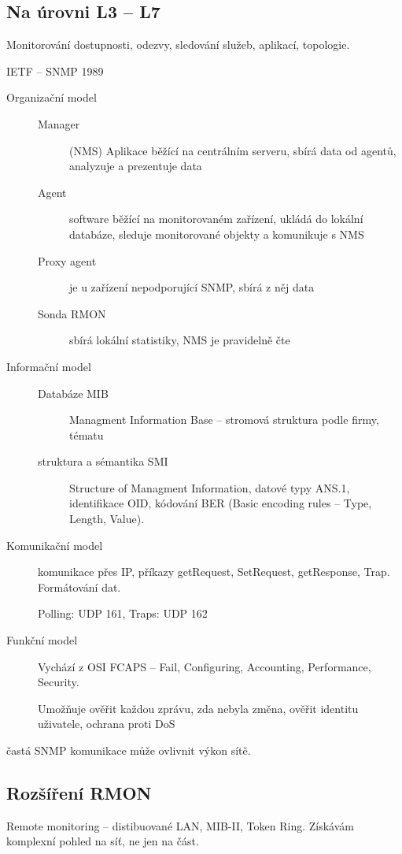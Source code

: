 \documentclass[a4paper, 11pt]{report}
\begin{document}
\subsection{Na úrovni L3 -- L7}
Monitorování dostupnosti, odezvy, sledování služeb, aplikací, topologie.

IETF -- SNMP 1989

\begin{description}
	\item[Organizační model] \hfill
	\begin{description}
		\item[Manager] (NMS) Aplikace běžící na centrálním serveru, sbírá data od agentů, analyzuje a prezentuje data
		\item[Agent] software běžící na monitorovaném zařízení, ukládá do lokální databáze, sleduje monitorované objekty a komunikuje s NMS
		\item[Proxy agent] je u zařízení nepodporující SNMP, sbírá z něj data
		\item[Sonda RMON] sbírá lokální statistiky, NMS je pravidelně čte
	\end{description}
	\item[Informační model] \hfill
	\begin{description}
		\item[Databáze MIB] Managment Information Base -- stromová struktura podle firmy, tématu
		\item[struktura a sémantika SMI] Structure of Managment Information, datové typy ANS.1, identifikace OID, kódování BER (Basic encoding rules -- Type, Length, Value).
	\end{description}
	\item[Komunikační model] komunikace přes IP, příkazy getRequest, SetRequest, getResponse, Trap. Formátování dat.
	
	Polling: UDP 161, Traps: UDP 162
	
	\item[Funkční model] Vychází z OSI FCAPS -- Fail, Configuring, Accounting, Performance, Security.
	
	Umožňuje ověřit každou zprávu, zda nebyla změna, ověřit identitu uživatele, ochrana proti DoS
\end{description}

častá SNMP komunikace může ovlivnit výkon sítě.

\subsection{Rozšíření RMON}
Remote monitoring -- distibuované LAN, MIB-II, Token Ring. Získávám komplexní pohled na síť, ne jen na část.
\end{document}
